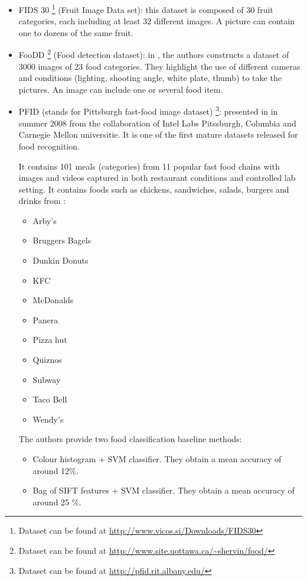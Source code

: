 \begin{itemize}
    In this paper, the authors obtain an average accuracy of 68.3 \%.
    
    \item FIDS 30 \footnote{Dataset can be found at \url{http://www.vicos.si/Downloads/FIDS30}} (Fruit Image Data set): this dataset \cite{FIDS30} is composed of 30 fruit categories, each including at least 32 different images. A picture can contain one to dozens of the same fruit.
    
    \item FooDD \footnote{Dataset can be found at \url{http://www.site.uottawa.ca/~shervin/food/}} (Food detection dataset): in \cite{ParisaPouladzadehAbdulsalamYassine2015}, the authors constructs a dataset of 3000 images of 23 food categories. They highlight the use of different cameras and conditions (lighting, shooting angle, white plate, thumb) to take the pictures. An image can include one or several food item.
    
    \item PFID (stands for Pittsburgh fast-food image dataset) \footnote{Dataset can be found at \url{http://pfid.rit.albany.edu/}}: presented in \cite{Chen2009} in summer 2008 from the collaboration of Intel Labs Pitssburgh, Columbia and Carnegie Mellon universitie. It is one of the first mature datasets released for food recognition.
    
    It contains 101 meals (categories) from 11 popular fast food chains with images and videos captured in both restaurant conditions and controlled lab setting. It contains foods such as chickens, sandwiches, salads, burgers and drinks from :
    \begin{itemize}
        \item Arby's
        \item Bruggers Bagels
        \item Dunkin Donuts
        \item KFC
        \item McDonalds
        \item Panera
        \item Pizza hut
        \item Quiznos
        \item Subway
        \item Taco Bell
        \item Wendy's
    \end{itemize}
    
    The authors provide two food classification baseline methods:
    \begin{itemize}
        \item Colour histogram + SVM classifier. They obtain a mean accuracy of around 12\%.
        \item Bag of SIFT features + SVM classifier. They obtain a mean accuracy of around 25 \%.
    \end{itemize}
    

\end{itemize}
